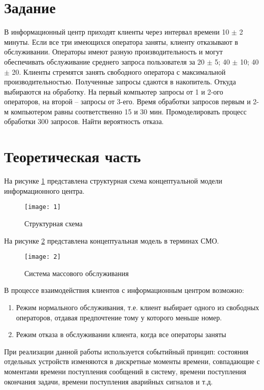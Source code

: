 \documentclass[a4paper,fontsize=12bp]{extreport}
\begin{document}
\section*{Задание}

В информационный центр приходят клиенты через интервал времени 10 $\pm$ 2 минуты. Если все три имеющихся оператора заняты, клиенту отказывают в обслуживании. Операторы имеют разную производительность и могут обеспечивать обслуживание среднего запроса пользователя за 20 $\pm$ 5; 40 $\pm$ 10; 40 $\pm$ 20. Клиенты стремятся занять свободного оператора с максимальной производительностью. Полученные запросы сдаются в накопитель. Откуда выбираются на обработку. На первый компьютер запросы от 1 и 2-ого операторов, на второй -- запросы от 3-его. Время обработки запросов первым и 2-м компьютером равны соответственно 15 и 30 мин. Промоделировать процесс обработки 300 запросов. Найти вероятность отказа. 
	
\section*{Теоретическая часть}
	
На рисунке \ref{fig:1} представлена структурная схема концептуальной модели информационного центра.

\begin{figure}[H]
    \texttt{[image: 1]}
    \caption{Структурная схема}
    \label{fig:1}
\end{figure}

На рисунке \ref{fig:2} представлена концептуальная модель в терминах СМО.
\begin{figure}[H]
    \texttt{[image: 2]}
    \caption{Система массового обслуживания}
    \label{fig:2}
\end{figure}

В процессе взаимодействия клиентов с информационным центром возможно:
 \begin{enumerate}
\item Режим нормального обслуживания, т.е. клиент выбирает одного из свободных операторов, отдавая предпочтение тому у которого меньше номер.

\item Режим отказа в обслуживании клиента, когда все операторы заняты
 \end{enumerate}
 
При реализации данной работы используется событийный принцип: состояния отдельных устройств изменяются в дискретные моменты времени, совпадающие с моментами времени поступления сообщений в систему, времени поступления окончания задачи, времени поступления аварийных сигналов и т.д.\\
 
\end{document}
